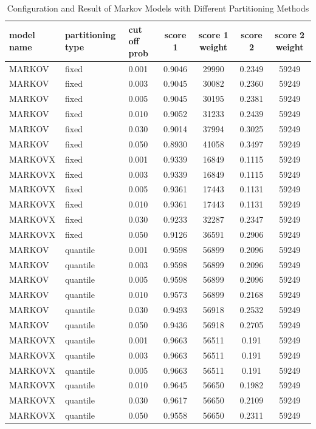 \documentclass{article}
\begin{document}
\begin{longtable}[htbp]{l|l|l|*{4}{c}}
    \caption{Configuration and Result of Markov Models with Different Partitioning Methods}
    \label{tab:tab1.3.4}\\
    \textbf{model name} & \textbf{partitioning type} & \textbf{cut off prob} & \textbf{score 1} & \textbf{score 1 weight} & \textbf{score 2} & \textbf{score 2 weight} \\
    \hline
    MARKOV & fixed & 0.001 & 0.9046 & 29990 & 0.2349 & 59249\\
    MARKOV & fixed & 0.003 & 0.9045 & 30082 & 0.2360 & 59249\\
    MARKOV & fixed & 0.005 & 0.9045 & 30195 & 0.2381 & 59249\\
    MARKOV & fixed & 0.010 & 0.9052 & 31233 & 0.2439 & 59249\\
    MARKOV & fixed & 0.030 & 0.9014 & 37994 & 0.3025 & 59249\\
    MARKOV & fixed & 0.050 & 0.8930 & 41058 & 0.3497 & 59249\\
    MARKOVX & fixed & 0.001 & 0.9339 & 16849 & 0.1115 & 59249\\
    MARKOVX & fixed & 0.003 & 0.9339 & 16849 & 0.1115 & 59249\\
    MARKOVX & fixed & 0.005 & 0.9361 & 17443 & 0.1131 & 59249\\
    MARKOVX & fixed & 0.010 & 0.9361 & 17443 & 0.1131 & 59249\\
    MARKOVX & fixed & 0.030 & 0.9233 & 32287 & 0.2347 & 59249\\
    MARKOVX & fixed & 0.050 & 0.9126 & 36591 & 0.2906 & 59249\\
    MARKOV & quantile & 0.001 & 0.9598 & 56899 & 0.2096 & 59249\\
    MARKOV & quantile & 0.003 & 0.9598 & 56899 & 0.2096 & 59249\\
    MARKOV & quantile & 0.005 & 0.9598 & 56899 & 0.2096 & 59249\\
    MARKOV & quantile & 0.010 & 0.9573 & 56899 & 0.2168 & 59249\\
    MARKOV & quantile & 0.030 & 0.9493 & 56918 & 0.2532 & 59249\\
    MARKOV & quantile & 0.050 & 0.9436 & 56918 & 0.2705 & 59249\\
    MARKOVX & quantile & 0.001 & 0.9663 & 56511 & 0.191 & 59249\\
    MARKOVX & quantile & 0.003 & 0.9663 & 56511 & 0.191 & 59249\\
    MARKOVX & quantile & 0.005 & 0.9663 & 56511 & 0.191 & 59249\\
    MARKOVX & quantile & 0.010 & 0.9645 & 56650 & 0.1982 & 59249\\
    MARKOVX & quantile & 0.030 & 0.9617 & 56650 & 0.2109 & 59249\\
    MARKOVX & quantile & 0.050 & 0.9558 & 56650 & 0.2311 & 59249\\

\end{longtable}
\end{document}
